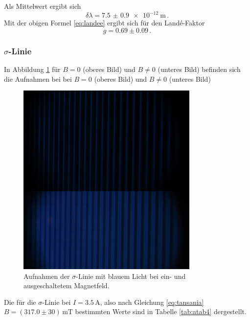 \FloatBarrier
\noindent
Als Mittelwert ergibt sich
\begin{equation*}
    \delta \lambda = \SI{7.5(09)e-12}{\meter} \, .
\end{equation*}
Mit der obigen Formel \eqref{eq:landee} ergibt sich für den Landé-Faktor
\begin{equation*}
    g = 0.69 \pm 0.09 \, .
\end{equation*}

\subsubsection*{$\sigma$-Linie}
In Abbildung \ref{fig:afig4} für $B = 0$ (oberes Bild) und $B \neq 0$ (unteres Bild) befinden sich die Aufnahmen bei
bei $B = 0$ (oberes Bild) und $B \neq 0$ (unteres Bild)
\FloatBarrier
\begin{figure}
    \centering
    \includegraphics[width=0.8\textwidth]{sigma.jpg}
    \caption{Aufnahmen der $\sigma$-Linie mit blauem Licht bei ein- und ausgeschaltetem Magnetfeld.}
    \label{fig:afig4}
\end{figure}
\FloatBarrier
Die für die $\sigma$-Linie bei $I = 3.5 \, \si{\ampere}$, also nach Gleichung \eqref{eq:tansania} $B = \left(317.0 \pm 30 \right) \, \si{\milli\tesla}$ bestimmten Werte sind in Tabelle \ref{tab:atab4} dergestellt.
\FloatBarrier
